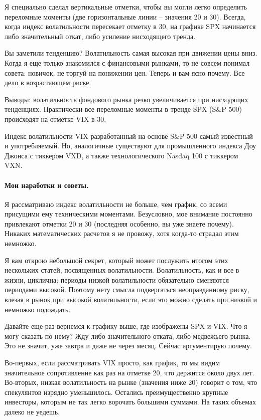 \documentclass[a5paper]{article}
\begin{document}
Я специально сделал вертикальные отметки, чтобы вы могли легко определить переломные моменты (две горизонтальные линии – значения 20 и 30). Всегда, когда индекс волатильности пересекает отметку в 30, на графике SPX начинается либо значительный откат, либо усиление нисходящего тренда.

Вы заметили тенденцию? Волатильность самая высокая при движении цены вниз. Когда я еще только знакомился с финансовыми рынками, то не совсем понимал совета: новичок, не торгуй на понижении цен. Теперь и вам ясно почему. Все дело в возрастающем риске.

Выводы: волатильность фондового рынка резко увеличивается при нисходящих тенденциях. Практически все переломные моменты в тренде SPX (S\&P 500) происходят на отметке VIX в 30.

Индекс волатильности VIX разработанный на основе S\&P 500 самый
известный и употребляемый. Но, аналогичные существуют для
промышленного индекса Доу Джонса с тиккером VXD, а также
технологического Nasdaq 100 с тиккером VXN.

\paragraph{Мои наработки и советы.}

Я рассматриваю индекс волатильности не больше, чем график, со всеми присущими ему техническими моментами. Безусловно, мое внимание постоянно привлекают отметки 20 и 30 (последняя особенно, вы уже знаете почему). Никаких математических расчетов я не провожу, хотя когда-то страдал этим немножко.

Я вам открою небольшой секрет, который может послужить итогом этих нескольких статей, посвященных волатильности. Волатильность, как и все в жизни, циклична: периоды низкой волатильности обязательно сменяются периодами высокой. Поэтому нету смысла подвергаться неоправданному риску, влезая в рынок при высокой волатильности, если это можно сделать при низкой и немножко подождать.

Давайте еще раз вернемся к графику выше, где изображены SPX и VIX. Что я могу сказать по нему? Жду либо значительного отката, либо медвежьего рынка. Это не значит, уже завтра и даже не через месяц. Сейчас аргументирую почему.

Во-первых, если рассматривать VIX просто, как график, то мы видим значительное сопротивление как раз на отметке 20, что держится около двух лет. Во-вторых, низкая волатильность на рынке (значения ниже 20) говорит о том, что спекулянтов изрядно уменьшилось. Остались преимущественно крупные инвесторы, которым не так легко ворочать большими суммами. На таких объемах далеко не уедешь.
\end{document}
